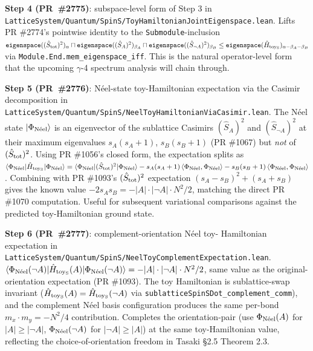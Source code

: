 \documentclass[a4paper,11pt]{article}
\begin{document}
\textbf{Step 4 (PR~\#2775)}: subspace-level form of Step 3 in
\texttt{LatticeSystem/Quantum/SpinS/ToyHamiltonianJointEigenspace.lean}.
Lifts PR \#2774's pointwise identity to the
\texttt{Submodule}-inclusion
$\texttt{eigenspace}((\hat S_{\rm tot})^2)_\alpha \sqcap
\texttt{eigenspace}((\hat S_A)^2)_{\beta_A} \sqcap
\texttt{eigenspace}((\hat S_{\neg A})^2)_{\beta_B} \le
\texttt{eigenspace}(\hat H_{\rm toy_S})_{\alpha - \beta_A - \beta_B}$
via \texttt{Module.End.mem\_eigenspace\_iff}. This is the natural
operator-level form that the upcoming $\gamma$-4 spectrum analysis will
chain through.

\textbf{Step 5 (PR~\#2776)}: Néel-state toy-Hamiltonian
expectation via the Casimir decomposition in
\texttt{LatticeSystem/Quantum/SpinS/NeelToyHamiltonianViaCasimir.lean}.
The Néel state $|\Phi_{\rm N\acute eel}\rangle$ is an eigenvector
of the sublattice Casimirs $(\hat S_A)^2$ and $(\hat S_{\neg A})^2$
at their maximum eigenvalues $s_A(s_A+1)$, $s_B(s_B+1)$ (PR \#1067)
but \emph{not} of $(\hat S_{\rm tot})^2$. Using PR \#1056's closed
form, the expectation splits as
$\langle\Phi_{\rm N\acute eel}|\hat H_{\rm toy_S}|\Phi_{\rm N\acute eel}\rangle
= \langle\Phi_{\rm N\acute eel}|(\hat S_{\rm tot})^2|\Phi_{\rm N\acute eel}\rangle
- s_A(s_A+1)\,\langle\Phi_{\rm N\acute eel},\Phi_{\rm N\acute eel}\rangle
- s_B(s_B+1)\,\langle\Phi_{\rm N\acute eel},\Phi_{\rm N\acute eel}\rangle$.
Combining with PR \#1093's $(\hat S_{\rm tot})^2$ expectation
$(s_A-s_B)^2 + (s_A+s_B)$ gives the known value $-2 s_A s_B =
-|A|\cdot|\neg A|\cdot N^2/2$, matching the direct PR \#1070
computation. Useful for subsequent variational comparisons
against the predicted toy-Hamiltonian ground state.

\textbf{Step 6 (PR~\#2777)}: complement-orientation Néel toy-
Hamiltonian expectation in
\texttt{LatticeSystem/Quantum/SpinS/NeelToyComplementExpectation.lean}.
$\langle\Phi_{\rm N\acute eel}(\neg A)|\hat H_{\rm toy_S}(A)|
\Phi_{\rm N\acute eel}(\neg A)\rangle = -|A|\cdot|\neg A|\cdot N^2/2$,
same value as the original-orientation expectation (PR \#1093).
The toy Hamiltonian is sublattice-swap invariant
($\hat H_{\rm toy_S}(A) = \hat H_{\rm toy_S}(\neg A)$ via
\texttt{sublatticeSpinSDot\_complement\_comm}), and the complement
Néel basis configuration produces the same per-bond
$m_x\cdot m_y = -N^2/4$ contribution. Completes the
orientation-pair (use $\Phi_{\rm N\acute eel}(A)$ for $|A|
\ge |\neg A|$, $\Phi_{\rm N\acute eel}(\neg A)$ for $|\neg A|
\ge |A|$) at the same toy-Hamiltonian value, reflecting the
choice-of-orientation freedom in Tasaki §2.5 Theorem 2.3.
\end{document}
